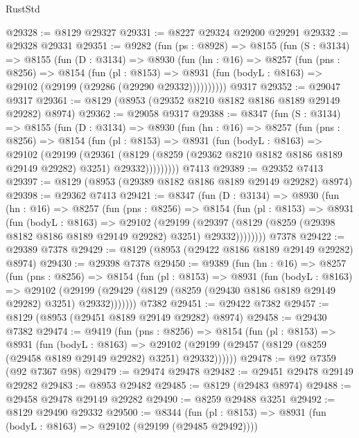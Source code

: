 \begin{lexlean}{RustStd}
\begin{coremodule}
@29328 := @8129 @29327
@29331 := @8227 @29324 @29200 @29291
@29332 := @29328 @29331
@29351 := @9282
    (fun (ps : @8928) =>
    @8155
      (fun (S : @3134) =>
      @8155
        (fun (D : @3134) =>
        @8930
          (fun (hn : @16) =>
          @8257
            (fun (pns : @8256) =>
            @8154
              (fun (pl : @8153) =>
              @8931 (fun (bodyL : @8163) => @29102 (@29199 (@29286 (@29290 @29332))))))))))
    @9317
@29352 := @29047 @9317
@29361 := @8129 (@8953 (@29352 @8210 @8182 @8186 @8189 @29149 @29282) @8974)
@29362 := @29058 @9317
@29388 := @8347
    (fun (S : @3134) =>
    @8155
      (fun (D : @3134) =>
      @8930
        (fun (hn : @16) =>
        @8257
          (fun (pns : @8256) =>
          @8154
            (fun (pl : @8153) =>
            @8931
              (fun (bodyL : @8163) =>
              @29102
                (@29199
                  (@29361
                    (@8129
                      (@8259 (@29362 @8210 @8182 @8186 @8189 @29149 @29282) @3251)
                      @29332)))))))))
    @7413
@29389 := @29352 @7413
@29397 := @8129 (@8953 (@29389 @8182 @8186 @8189 @29149 @29282) @8974)
@29398 := @29362 @7413
@29421 := @8347
    (fun (D : @3134) =>
    @8930
      (fun (hn : @16) =>
      @8257
        (fun (pns : @8256) =>
        @8154
          (fun (pl : @8153) =>
          @8931
            (fun (bodyL : @8163) =>
            @29102
              (@29199
                (@29397 (@8129 (@8259 (@29398 @8182 @8186 @8189 @29149 @29282) @3251) @29332))))))))
    @7378
@29422 := @29389 @7378
@29429 := @8129 (@8953 (@29422 @8186 @8189 @29149 @29282) @8974)
@29430 := @29398 @7378
@29450 := @9389
    (fun (hn : @16) =>
    @8257
      (fun (pns : @8256) =>
      @8154
        (fun (pl : @8153) =>
        @8931
          (fun (bodyL : @8163) =>
          @29102
            (@29199 (@29429 (@8129 (@8259 (@29430 @8186 @8189 @29149 @29282) @3251) @29332)))))))
    @7382
@29451 := @29422 @7382
@29457 := @8129 (@8953 (@29451 @8189 @29149 @29282) @8974)
@29458 := @29430 @7382
@29474 := @9419
    (fun (pns : @8256) =>
    @8154
      (fun (pl : @8153) =>
      @8931
        (fun (bodyL : @8163) =>
        @29102 (@29199 (@29457 (@8129 (@8259 (@29458 @8189 @29149 @29282) @3251) @29332))))))
@29478 := @92 @7359 (@92 @7367 @98)
@29479 := @29474 @29478
@29482 := @29451 @29478 @29149 @29282
@29483 := @8953 @29482
@29485 := @8129 (@29483 @8974)
@29488 := @29458 @29478 @29149 @29282
@29490 := @8259 @29488 @3251
@29492 := @8129 @29490 @29332
@29500 := @8344
    (fun (pl : @8153) => @8931 (fun (bodyL : @8163) => @29102 (@29199 (@29485 @29492))))

\end{coremodule}
\end{lexlean}

